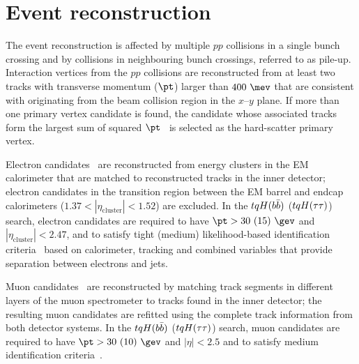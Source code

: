 
\section{Event reconstruction}
\label{sec:objects}

The event reconstruction is affected by multiple $pp$ collisions in a single bunch crossing and by collisions
in neighbouring bunch crossings, referred to as pile-up. 
Interaction vertices from the $pp$ collisions are reconstructed from at least two tracks 
with transverse momentum ($\pt$) larger than $400~\mev$ that are consistent with originating from the 
beam collision region in the $x$--$y$ plane. If more than one primary vertex candidate is found, the
candidate whose associated tracks form the largest sum of squared $\pt$~\cite{ATL-PHYS-PUB-2015-026}
is selected as the hard-scatter primary vertex.

Electron candidates~\cite{ATLAS-CONF-2016-024,ATL-PHYS-PUB-2016-015} are reconstructed from energy 
clusters in the EM calorimeter that are matched to reconstructed tracks in the inner detector;
electron candidates in the transition region between the EM barrel and endcap calorimeters 
($1.37 < |\eta_{\textrm{cluster}}| < 1.52$) are excluded.
In the $tqH(b\bar{b})$ ($tqH(\tau\tau)$) search, electron candidates are required to have $\pt>30~(15)~\gev$ and 
$|\eta_{\textrm{cluster}}| < 2.47$, and to satisfy tight (medium) likelihood-based identification 
criteria~\cite{ATLAS-CONF-2016-024} based on calorimeter, tracking and combined variables that provide 
separation between electrons and jets. 

Muon candidates~\cite{Aad:2016jkr} are reconstructed by matching track segments in %
different layers of the muon spectrometer to tracks found in the inner detector;
the resulting muon candidates are refitted using the complete track information from both detector systems.
In the $tqH(b\bar{b})$ ($tqH(\tau\tau)$) search, muon candidates are required to have $\pt>30~(10)~\gev$ and $|\eta|<2.5$ 
and to satisfy medium identification criteria~\cite{Aad:2016jkr}. 


